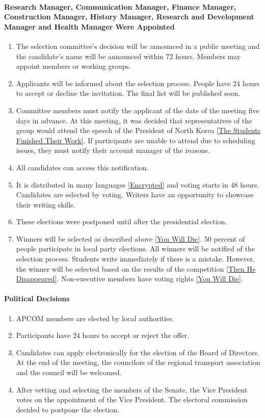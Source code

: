 \documentclass{article}
\newcommand{\asubsubsection}[1]{\paragraph{#1} \label{#1}}
\begin{document}
\asubsubsection{Research Manager, Communication Manager, Finance Manager, Construction Manager, History Manager, Research and Development Manager and Health Manager Were Appointed}
\begin{enumerate}
	\item The selection committee's decision will be announced in a public meeting and the candidate's name will be announced within 72 hours.
	      Members may appoint members or working groups.
	\item Applicants will be informed about the selection process.
	      People have 24 hours to accept or decline the invitation.
	      The final list will be published soon.
	\item Committee members must notify the applicant of the date of the meeting five days in advance.
	      At this meeting, it was decided that representatives of the group would attend the speech of the President of North Korea \ref{The Students Finished Their Work}.
	      If participants are unable to attend due to scheduling issues, they must notify their account manager of the reasons.
	\item All candidates can access this notification.
	\item It is distributed in many languages \ref{Encrypted} and voting starts in 48 hours.
	      Candidates are selected by voting.
	      Writers have an opportunity to showcase their writing skills.
	\item These elections were postponed until after the presidential election.
	\item Winners will be selected as described above \ref{You Will Die}.
	      50 percent of people participate in local party elections.
	      All winners will be notified of the selection process.
	      Students write immediately if there is a mistake.
	      However, the winner will be selected based on the results of the competition \ref{Then He Disappeared}.
	      Non-executive members have voting rights \ref{You Will Die}.
\end{enumerate}

\asubsubsection{Political Decisions}
\renewcommand{\theenumi}{\alph{enumi}} %

\begin{enumerate}
	\item APCOM members are elected by local authorities.
	\item Participants have 24 hours to accept or reject the offer.
	\item Candidates can apply electronically for the election of the Board of Directors.
	      At the end of the meeting, the councilors of the regional transport association and the council will be welcomed.
	\item After vetting and selecting the members of the Senate, the Vice President votes on the appointment of the Vice President.
	      The electoral commission decided to postpone the election.
\end{enumerate}
\end{document}
